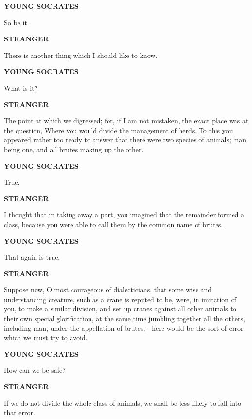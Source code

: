 \documentclass[11pt,letter]{article}
\begin{document}
\par \textbf{YOUNG SOCRATES}
\par   So be it.

\par \textbf{STRANGER}
\par   There is another thing which I should like to know.

\par \textbf{YOUNG SOCRATES}
\par   What is it?

\par \textbf{STRANGER}
\par   The point at which we digressed; for, if I am not mistaken, the exact place was at the question, Where you would divide the management of herds. To this you appeared rather too ready to answer that there were two species of animals; man being one, and all brutes making up the other.

\par \textbf{YOUNG SOCRATES}
\par   True.

\par \textbf{STRANGER}
\par   I thought that in taking away a part, you imagined that the remainder formed a class, because you were able to call them by the common name of brutes.

\par \textbf{YOUNG SOCRATES}
\par   That again is true.

\par \textbf{STRANGER}
\par   Suppose now, O most courageous of dialecticians, that some wise and understanding creature, such as a crane is reputed to be, were, in imitation of you, to make a similar division, and set up cranes against all other animals to their own special glorification, at the same time jumbling together all the others, including man, under the appellation of brutes,—here would be the sort of error which we must try to avoid.

\par \textbf{YOUNG SOCRATES}
\par   How can we be safe?

\par \textbf{STRANGER}
\par   If we do not divide the whole class of animals, we shall be less likely to fall into that error.
\end{document}
